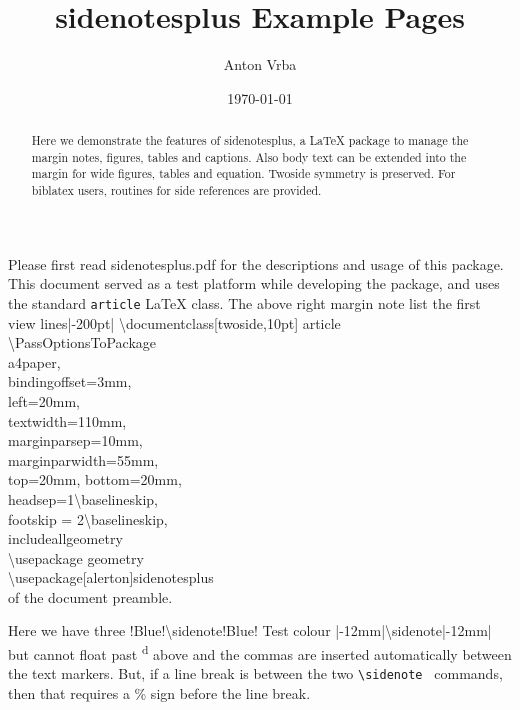 \documentclass[twoside,10pt,ragged]{article}
\title{\textbf{\textsf{sidenotesplus}} Example Pages}
\author{Anton Vrba}
\date{	\today}
\begin{document}
	\maketitle
	
	\begin{abstract}
		\noindent Here we demonstrate the features of \textsf{sidenotesplus},
        a \LaTeX\xspace package to manage the margin notes, figures, tables and captions.
        Also body text can be extended into the margin for wide figures, tables and equation.
        Twoside symmetry is preserved. For biblatex users, routines for side references are
        provided.
	\end{abstract}


Please first read \textsf{sidenotesplus.pdf} for the descriptions and usage of this package.
This document served as a test platform while developing the package, and uses the standard
\verb"article" \LaTeX\xspace class. The above right margin note list the first view
lines\sidenote|-200pt|{%
\ttfamily\upshape\textbackslash documentclass[twoside,10pt]\textbraceleft
article\textbraceright\\
\textbackslash PassOptionsToPackage\textbraceleft\\
\makebox[2ex]{} a4paper,\\
\makebox[2ex]{} bindingoffset=3mm,\\
\makebox[2ex]{} left=20mm,\\
\makebox[2ex]{} textwidth=110mm,\\
\makebox[2ex]{} marginparsep=10mm,\\
\makebox[2ex]{} marginparwidth=55mm,\\
\makebox[2ex]{} top=20mm, bottom=20mm,\\
\makebox[2ex]{} headsep=1\textbackslash baselineskip,\\
\makebox[2ex]{} footskip = 2\textbackslash baselineskip,\\
\makebox[2ex]{} includeall\textbraceright   \textbraceleft geometry\textbraceright\\
\textbackslash usepackage  \textbraceleft geometry\textbraceright\\
\textbackslash usepackage[alerton]\textbraceleft sidenotesplus\textbraceright\\
} of the document preamble.

Here we have three %
\sidenote!Blue!{\textsf{\upshape\textbackslash sidenote!Blue!} Test colour}%
\sidenote|-12mm|{\textsf{\upshape\textbackslash sidenote|-12mm|} but cannot float past \textsuperscript d above}
 and the commas are inserted automatically between the text markers. But, if a line break
 is between the two \verb"\sidenote " commands, then that requires a \% sign before the line
 break.
\end{document}
